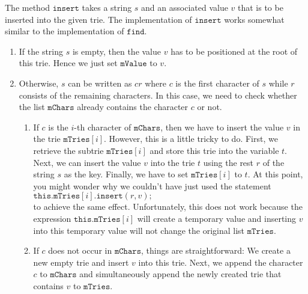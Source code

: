 The method $\mathtt{insert}$ takes a string $s$ and an associated value $v$ that is to be inserted
into the given trie.  The implementation of $\mathtt{insert}$ works somewhat similar to the
implementation of $\mathtt{find}$.
\begin{enumerate}
\item If the string $s$ is empty, then the value $v$ has to be positioned at the root of this trie.
      Hence we just set $\mathtt{mValue}$ to $v$.
\item Otherwise, $s$ can be written as $cr$ where $c$ is the first character of $s$ while $r$
      consists of the remaining characters.  In this case, we need to check whether the list
      $\mathtt{mChars}$ already contains the character $c$ or not.
      \begin{enumerate}
      \item If $c$ is the $i$-th character of $\mathtt{mChars}$, then we have to insert the value $v$
            in the trie $\mathtt{mTries}[i]$.  However, this is a little tricky to do.
            First, we retrieve the subtrie $\mathtt{mTries}[i]$ and store this trie into the
            variable $t$.  Next, we can insert the value $v$ into the trie $t$ using the rest $r$ of the
            string $s$ as the key.  Finally, we have to set $\mathtt{mTries}[i]$ to $t$.  At this point, you
            might wonder why we couldn't have just used the statement
            \\[0.2cm]
            \hspace*{1.3cm}
            $\mathtt{this}.\mathtt{mTries}[i].\mathtt{insert}(r,v)\mathtt{;}$
            \\[0.2cm]
            to achieve the same effect. Unfortunately, this does not work because the expression $\mathtt{this}.\mathtt{mTries}[i]$ will
            create a temporary value and inserting $v$ into this temporary value will not change the
            original list $\mathtt{mTries}$.
      \item If $c$ does not occur in $\mathtt{mChars}$, things are straightforward: We create a new
            empty trie and insert $v$ into this trie.  Next, we append the character $c$ to
            $\mathtt{mChars}$ and simultaneously append the newly created trie that contains $v$ to
            $\mathtt{mTries}$. 
      \end{enumerate}
\end{enumerate}

